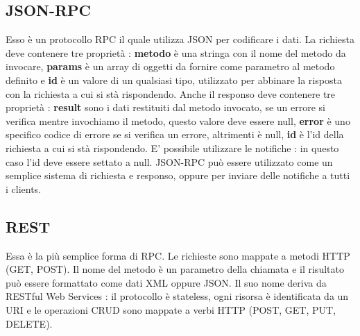 \documentclass[12pt]{report}
\begin{document}
\subsection{JSON-RPC}
Esso è un protocollo RPC il quale utilizza JSON per codificare i dati. La richiesta deve contenere tre proprietà : \textbf{metodo} è una stringa con il nome del metodo da invocare, \textbf{params} è un array di oggetti da fornire come parametro al metodo definito e \textbf{id} è un valore di un qualsiasi tipo, utilizzato per abbinare la risposta con la richiesta a cui si stà rispondendo. Anche il responso deve contenere tre proprietà : \textbf{result} sono i dati restituiti dal metodo invocato, se un errore si verifica mentre invochiamo il metodo, questo valore deve essere null, \textbf{error} è uno specifico codice di errore se si verifica un errore, altrimenti è null, \textbf{id} è l'id della richiesta a cui si stà rispondendo. E' possibile utilizzare le notifiche : in questo caso l'id deve essere settato a null. JSON-RPC può essere utilizzato come un semplice sistema di richiesta e responso, oppure per inviare delle notifiche a tutti i clients.
\subsection{REST}
Essa è la più semplice forma di RPC. Le richieste sono mappate a metodi HTTP (GET, POST). Il nome del metodo è un parametro della chiamata e il risultato può essere formattato come dati XML oppure JSON. Il suo nome deriva da RESTful Web Services : il protocollo è stateless, ogni risorsa è identificata da un URI e le operazioni CRUD sono mappate a verbi HTTP (POST, GET, PUT, DELETE).
\end{document}
